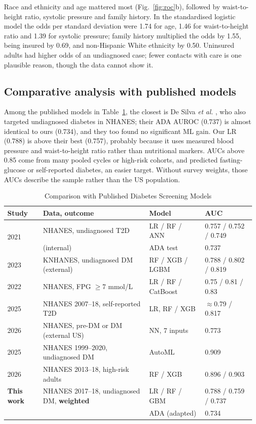 Race and ethnicity and age mattered most (Fig.~\ref{fig:roc}b), followed by waist-to-height ratio, systolic pressure and family history. In the standardised logistic model the odds per standard deviation were 1.74 for age, 1.46 for waist-to-height ratio and 1.39 for systolic pressure; family history multiplied the odds by 1.55, being insured by 0.69, and non-Hispanic White ethnicity by 0.50. Uninsured adults had higher odds of an undiagnosed case; fewer contacts with care is one plausible reason, though the data cannot show it.

\subsection{Comparative analysis with published models}
Among the published models in Table~\ref{tab:bench}, the closest is De Silva \textit{et al.} \cite{desilva2021}, who also targeted undiagnosed diabetes in NHANES; their ADA AUROC (0.737) is almost identical to ours (0.734), and they too found no significant ML gain. Our LR (0.788) is above their best (0.757), probably because it uses measured blood pressure and waist-to-height ratio rather than nutritional markers. AUCs above 0.85 \cite{liu2025,yang2026} come from many pooled cycles or high-risk cohorts, and \cite{qin2022,riverosperez2025} predicted fasting-glucose or self-reported diabetes, an easier target. Without survey weights, those AUCs describe the sample rather than the US population.

\begin{table}[t]
\caption{Comparison with Published Diabetes Screening Models}
\label{tab:bench}
\centering
\footnotesize
\setlength{\tabcolsep}{2.5pt}
\begin{tabular}{@{}p{1.15cm}p{2.75cm}p{1.45cm}p{1.6cm}@{}}
\toprule
\textbf{Study} & \textbf{Data, outcome} & \textbf{Model} & \textbf{AUC} \\
\midrule
\multirow{2}{*}{\cite{desilva2021} 2021} & NHANES, undiagnosed T2D & LR / RF / ANN & 0.757 / 0.752 / 0.749 \\
 & (internal) & ADA test & 0.737 \\
\cite{choi2023} 2023 & KNHANES, undiagnosed DM (external) & RF / XGB / LGBM & 0.788 / 0.802 / 0.819 \\
\cite{qin2022} 2022 & NHANES, FPG $\geq$7 mmol/L & LR / RF / CatBoost & 0.75 / 0.81 / 0.83 \\
\cite{riverosperez2025} 2025 & NHANES 2007--18, self-reported T2D & LR, RF / XGB & $\approx$0.79 / 0.817 \\
\cite{yoo2026} 2026 & NHANES, pre-DM or DM (external US) & NN, 7 inputs & 0.773 \\
\cite{liu2025} 2025 & NHANES 1999--2020, undiagnosed DM & AutoML & 0.909 \\
\cite{yang2026} 2026 & NHANES 2013--18, high-risk adults & RF / XGB & 0.896 / 0.903 \\
\midrule
\textbf{This work} & NHANES 2017--18, undiagnosed DM, \textbf{weighted} & LR / RF / GBM & 0.788 / 0.759 / 0.737 \\
 & & ADA (adapted) & 0.734 \\
\bottomrule
\end{tabular}
\end{table}

